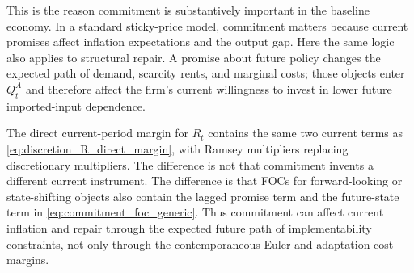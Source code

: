 ﻿\documentclass[12pt]{article}
\theoremstyle{remark}
\begin{document}
This is the reason commitment is substantively important in the baseline economy. In a standard
sticky-price model, commitment matters because current promises affect inflation expectations and
the output gap. Here the same logic also applies to structural repair. A promise about future
policy changes the expected path of demand, scarcity rents, and marginal costs; those objects
enter $Q_t^A$ and therefore affect the firm's current willingness to invest in lower future
imported-input dependence.

The direct current-period margin for $R_t$ contains the same two current terms as
\eqref{eq:discretion_R_direct_margin}, with Ramsey multipliers replacing discretionary multipliers.
The difference is not that commitment invents a different current instrument. The difference is that
FOCs for forward-looking or state-shifting objects also contain the lagged promise term and the
future-state term in \eqref{eq:commitment_foc_generic}. Thus commitment can affect current inflation
and repair through the expected future path of implementability constraints, not only through the
contemporaneous Euler and adaptation-cost margins.
\end{document}
